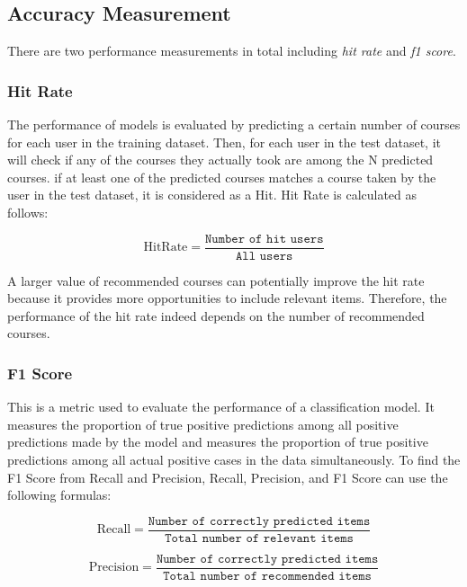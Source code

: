 \subsection{Accuracy Measurement}
There are two performance measurements in total including \textit{hit rate} and \textit{f1 score}.

\subsubsection{Hit Rate}
The performance of models is evaluated by predicting a certain number of courses for each user in the training dataset. Then, for each user in the test dataset, it will check if any of the courses they actually took are among the N predicted courses. if at least one of the predicted courses matches a course taken by the user in the test dataset, it is considered as a Hit. 
Hit Rate is calculated as follows:

\begin{equation}
    \text{HitRate} = \frac{\texttt{Number of hit users}}{\texttt{All users}}
\end{equation}

\noindent A larger value of recommended courses can potentially improve the hit rate because it provides more opportunities to include relevant items. Therefore, the performance of the hit rate indeed depends on the number of recommended courses.


\subsubsection{F1 Score}
This is a metric used to evaluate the performance of a classification model. It measures the proportion of true positive predictions among all positive predictions made by the model and measures the proportion of true positive predictions among all actual positive cases in the data simultaneously.
To find the F1 Score from Recall and Precision, Recall, Precision, and F1 Score can use the following formulas:

\begin{equation}
    \text{Recall} = \frac{\texttt{Number of correctly predicted items}}{\texttt{Total number of relevant items}}
\end{equation}

\begin{equation}
    \text{Precision} = \frac{\texttt{Number of correctly predicted items}}{\texttt{Total number of recommended items}}
\end{equation}

